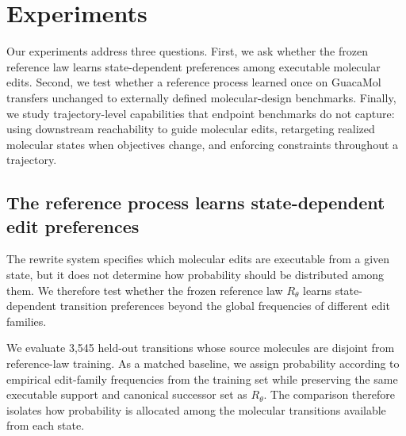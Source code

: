 %
%
%

\section{Experiments}
\label{sec:gem-experiments}

Our experiments address three questions. First, we ask whether the frozen reference
law learns state-dependent preferences among executable molecular edits. Second,
we test whether a reference process learned once on GuacaMol transfers unchanged
to externally defined molecular-design benchmarks. Finally, we study
trajectory-level capabilities that endpoint benchmarks do not capture: using
downstream reachability to guide molecular edits, retargeting realized molecular
states when objectives change, and enforcing constraints throughout a
trajectory.

\subsection{The reference process learns state-dependent edit preferences}
\label{sec:gem-exp-rtheta}

The rewrite system specifies which molecular edits are executable from a given
state, but it does not determine how probability should be distributed among
them. We therefore test whether the frozen reference law $R_\theta$ learns
state-dependent transition preferences beyond the global frequencies of
different edit families.

We evaluate 3{,}545 held-out transitions whose source molecules are disjoint
from reference-law training. As a matched baseline, we assign probability
according to empirical edit-family frequencies from the training set while
preserving the same executable support and canonical successor set as
$R_\theta$. The comparison therefore isolates how probability is allocated among
the molecular transitions available from each state.


